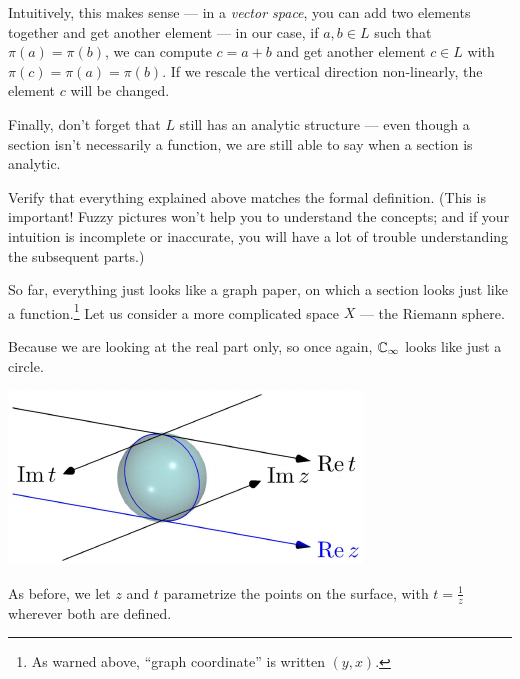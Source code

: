 Intuitively, this makes sense --- in a \emph{vector space}, you can add two elements together and
get another element --- in our case, if $a, b \in L$ such that $\pi(a) = \pi(b)$, we can compute
$c = a + b$ and get another element $c \in L$ with $\pi(c) = \pi(a) = \pi(b)$. If we rescale the
vertical direction non-linearly, the element $c$ will be changed.

Finally, don't forget that $L$ still has an analytic structure --- even though a section isn't
necessarily a function, we are still able to say when a section is analytic.

\begin{ques}
	Verify that everything explained above matches the formal definition.
	(This is important! Fuzzy pictures won't help you to understand the concepts;
	and if your intuition is incomplete or inaccurate, you will have a lot of
	trouble understanding the subsequent parts.)
\end{ques}

So far, everything just looks like a graph paper, on which a section looks just like a
function.\footnote{As warned above, ``graph coordinate'' is written $(y, x)$.}
Let us consider a more complicated space $X$ --- the Riemann sphere.

Because we are looking at the real part only, so once again, $\mathbb C_\infty$ looks like just a circle.
\begin{center}
	\includegraphics{3dfigures/pdf/Cinf.pdf}
\end{center}
As before, we let $z$ and $t$ parametrize the points on the surface, with $t = \frac{1}{z}$ wherever
both are defined.

